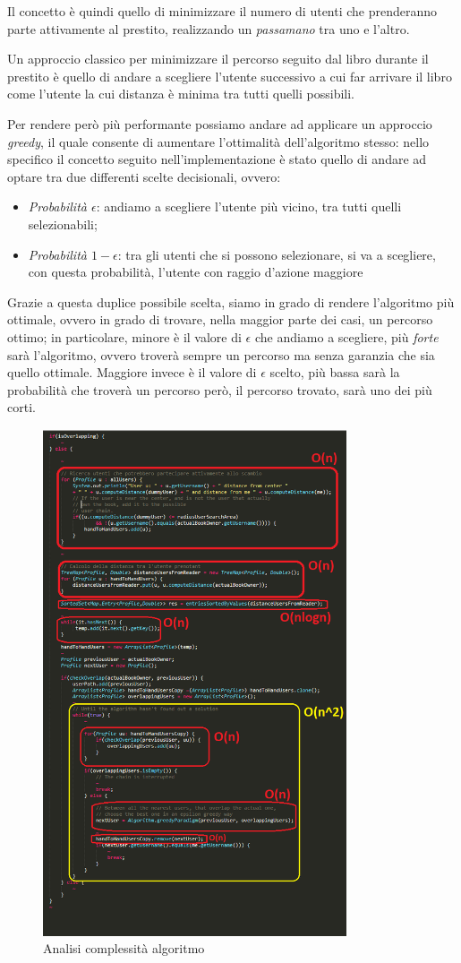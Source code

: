 Il concetto è quindi quello di minimizzare il numero di utenti che prenderanno parte attivamente al prestito, realizzando un \textit{passamano} tra uno e l'altro.

Un approccio classico per minimizzare il percorso seguito dal libro durante il prestito è quello di andare a scegliere l'utente successivo a cui far arrivare il libro come l'utente la cui distanza è minima tra tutti quelli possibili.

Per rendere però più performante possiamo andare ad applicare un approccio \textit{greedy}, il quale consente di aumentare l'ottimalità dell'algoritmo stesso: nello specifico il concetto seguito nell'implementazione è stato quello di andare ad optare tra due differenti scelte decisionali, ovvero:
\begin{itemize}
	\item \textit{Probabilità $\epsilon$}: andiamo a scegliere l'utente più vicino, tra tutti quelli selezionabili;
	\item \textit{Probabilità $1 - \epsilon$}: tra gli utenti che si possono selezionare, si va a scegliere, con questa probabilità, l'utente con raggio d'azione maggiore
\end{itemize}

Grazie a questa duplice possibile scelta, siamo in grado di rendere l'algoritmo più ottimale, ovvero in grado di trovare, nella maggior parte dei casi, un percorso ottimo; in particolare, minore è il valore di $\epsilon$ che andiamo a scegliere, più \textit{forte} sarà l'algoritmo, ovvero troverà sempre un percorso ma senza garanzia che sia quello ottimale.
Maggiore invece è il valore di $\epsilon$ scelto, più bassa sarà la probabilità che troverà un percorso però, il percorso trovato, sarà uno dei più corti.

\begin{figure}[h!]
	\centering
	\includegraphics[width=0.8\textwidth]{Immagini/Alg_complx.png}
	\caption{Analisi complessità algoritmo}
	\label{fig:Alg_cmplx}
\end{figure}